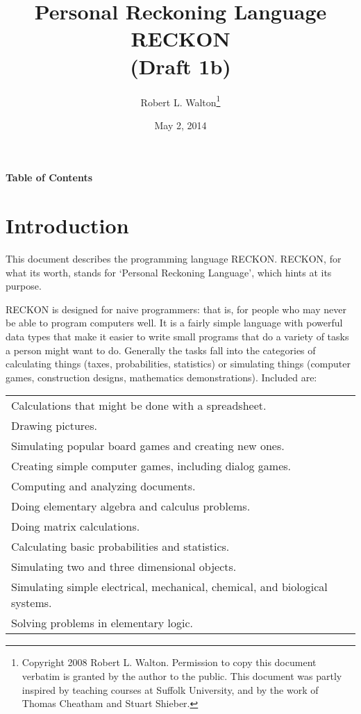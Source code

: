 \documentclass[12pt]{article}
\makeatletter
\renewcommand\tableofcontents{%
    \begin{list}{}%
	     {\setlength{\itemsep}{0in}%
	      \setlength{\topsep}{0in}%
	      \setlength{\parsep}{1ex}%
	      \setlength{\labelwidth}{0in}%
	      \setlength{\baselineskip}{1.5ex}%
	      \setlength{\leftmargin}{0.8in}%
	      \setlength{\rightmargin}{0.8in}}%
    \item\@starttoc{toc}%
    \end{list}}
\makeatother
\begin{document}
        
\title{Personal Reckoning Language\\[2ex]
       RECKON\\[2ex]
       (Draft 1b)}

\author{Robert L. Walton\thanks{Copyright 2008 Robert L. Walton.
Permission to copy this document verbatim is granted by the author
to the public.  This document was partly inspired
by teaching courses at Suffolk University, and by the work of Thomas
Cheatham and Stuart Shieber.}}

\date{May 2, 2014}

\maketitle

\newpage
\begin{center}
\large \bf Table of Contents
\end{center}

\bigskip

\tableofcontents 

\newpage

\section{Introduction}

This document describes the programming language RECKON.  RECKON,
for what its worth, stands for `Personal Reckoning Language',
which hints at its purpose.

RECKON is designed for naive programmers: that is, for people who may never
be able to program computers well.  It is a fairly simple language with
powerful data types that make it easier to write small programs
that do a variety of tasks a person might want to do.  Generally
the tasks fall into the categories of calculating things (taxes,
probabilities, statistics) or simulating things
(computer games, construction designs, mathematics demonstrations).
Included are:

\begin{center}
\begin{tabular}{l}
Calculations that might be done with a spreadsheet. \\
Drawing pictures. \\
Simulating popular board games and creating new ones. \\
Creating simple computer games, including dialog games. \\
Computing and analyzing documents. \\
Doing elementary algebra and calculus problems. \\
Doing matrix calculations. \\ 
Calculating basic probabilities and statistics. \\
Simulating two and three dimensional objects. \\
Simulating simple electrical, mechanical, chemical, and biological systems.\\
Solving problems in elementary logic. \\
\end{tabular}
\end{center}
\end{document}
